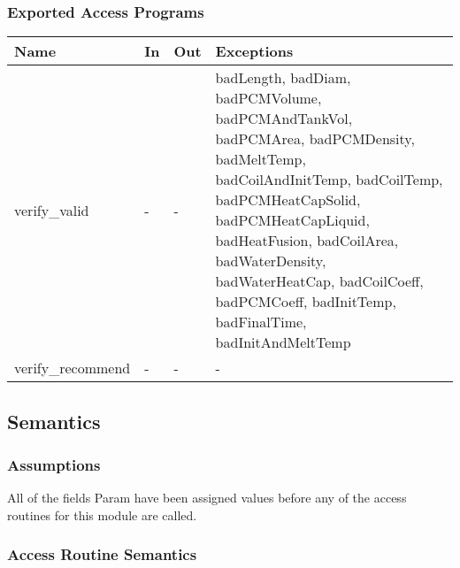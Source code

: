 \documentclass[12pt]{article}
\begin{document}
\subsubsection{Exported Access Programs}

\begin{center}
\begin{tabular}{p{3cm} p{1cm} p{1cm} p{9cm}}
\hline
\textbf{Name} & \textbf{In} & \textbf{Out} & \textbf{Exceptions} \\
\hline
verify\_valid & - & - & badLength, badDiam, badPCMVolume, badPCMAndTankVol,
                        badPCMArea, badPCMDensity, badMeltTemp,
                        badCoilAndInitTemp, badCoilTemp, badPCMHeatCapSolid,
                        badPCMHeatCapLiquid, badHeatFusion, badCoilArea,
                        badWaterDensity, badWaterHeatCap, badCoilCoeff,
                        badPCMCoeff, badInitTemp, badFinalTime,
                        badInitAndMeltTemp \\
\hline
verify\_recommend & - & - & - \\
\hline
\end{tabular}
\end{center}

\subsection{Semantics}



\subsubsection{Assumptions}

All of the fields Param have been assigned values before any of the access
routines for this module are called.

\subsubsection{Access Routine Semantics}
\end{document}
